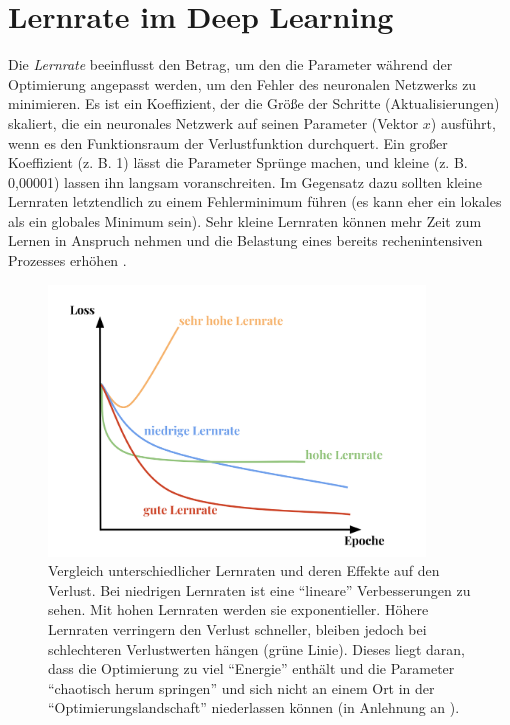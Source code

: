 \section{Lernrate im Deep Learning}\label{learnsection}
Die \textit{Lernrate} beeinflusst den Betrag, um den die Parameter während der Optimierung angepasst werden, um den Fehler des neuronalen Netzwerks zu minimieren. Es ist ein Koeffizient, der die Größe der Schritte (Aktualisierungen) skaliert, die ein neuronales Netzwerk auf seinen Parameter (Vektor $x$) ausführt, wenn es den Funktionsraum der Verlustfunktion durchquert. Ein großer Koeffizient (z. B. 1) lässt die Parameter Sprünge machen, und kleine (z. B. 0,00001) lassen ihn langsam voranschreiten. Im Gegensatz dazu sollten kleine Lernraten letztendlich zu einem Fehlerminimum führen (es kann eher ein lokales als ein globales Minimum sein). Sehr kleine Lernraten können mehr Zeit zum Lernen in Anspruch nehmen und die Belastung eines bereits rechenintensiven Prozesses erhöhen  \cite*[77]{Patterson2019}.


\begin{figure}[H]
    \centering
    \includegraphics[width=10cm]{kapitel2/learnrate.png}
    \caption[Einfluss der Lernrate auf den Verlust]{Vergleich unterschiedlicher Lernraten und deren Effekte auf den Verlust. Bei niedrigen Lernraten ist eine \enquote{lineare} Verbesserungen zu sehen. Mit hohen Lernraten werden sie exponentieller. Höhere Lernraten verringern den Verlust schneller, bleiben jedoch bei schlechteren Verlustwerten hängen (grüne Linie). Dieses liegt daran, dass die Optimierung zu viel \enquote{Energie} enthält und die Parameter \enquote{chaotisch herum springen} und sich nicht an einem Ort in der \enquote{Optimierungslandschaft} niederlassen können (in Anlehnung an \cite*{StanfordUniversityCoursecs231n2018}). }
    \label{Kap2:Lern}
\end{figure}

